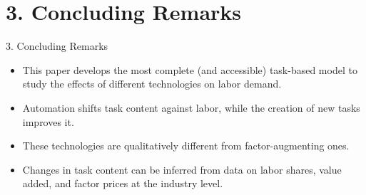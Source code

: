 \documentclass[notes=show]{beamer}
\begin{document}
\section{3. Concluding Remarks}

\begin{frame}{3. Concluding Remarks}
\begin{itemize}
\item This paper develops the most complete (and accessible) task-based model to study the effects of different technologies on labor demand. \medskip
\item Automation shifts task content against labor, while the creation of new tasks improves it. \medskip
\item These technologies are qualitatively different from factor-augmenting ones. \medskip
\item Changes in task content can be inferred from data on labor shares, value added, and factor prices at the industry level.
\end{itemize}
\end{frame}
\end{document}
